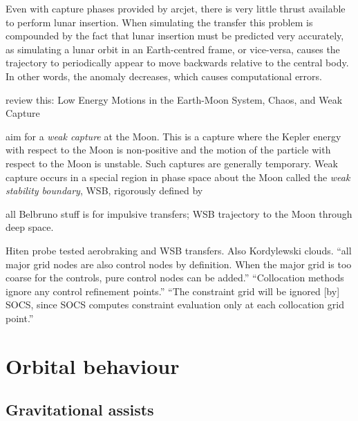 

Even with capture phases provided by arcjet, there is very little thrust available to perform lunar insertion. When simulating the transfer this problem is compounded by the fact that lunar insertion must be predicted very accurately, as simulating a lunar orbit in an Earth-centred frame, or vice-versa, causes the trajectory to periodically appear to move backwards relative to the central body. In other words, the anomaly decreases, which causes computational errors.

review this: Low Energy Motions in the Earth-Moon System, Chaos, and Weak Capture \parencite{Belbruno2007}

aim for a \emph{weak capture} at the Moon. This is a capture where the Kepler energy with respect to the Moon is non-positive and the motion of the particle with respect to the Moon is unstable. Such captures are generally temporary. Weak capture occurs in a special region in phase space about the Moon called the \emph{weak stability boundary}, WSB, rigorously defined by \textcite{Belbruno2004}

all Belbruno stuff is for impulsive transfers; WSB trajectory to the Moon through deep space.

Hiten probe tested aerobraking and WSB transfers. Also Kordylewski clouds.
\cite{ASTOS_guide} \enquote{all major grid nodes are also control nodes by definition. When the major grid is too coarse for the controls, pure control nodes can be added.} \enquote{Collocation methods ignore any control refinement points.} \enquote{The constraint grid will be ignored [by] SOCS, since SOCS computes constraint evaluation only at each collocation grid point.}

\section{Orbital behaviour}

\subsection{Gravitational assists} \label{sub:Grav-assist}

